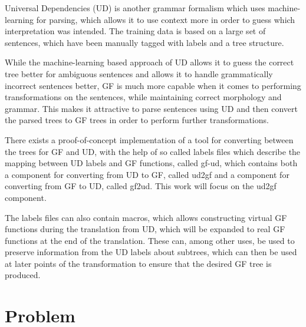\documentclass{article}
\begin{document}
Universal Dependencies\cite{mcdonald-al-2013} (UD) is another grammar formalism which uses machine-learning for parsing, which allows it to use context more in order to guess which interpretation was intended. The training data is based on a large set of sentences, which have been manually tagged with labels and a tree structure.

While the machine-learning based approach of UD allows it to guess the correct tree better for ambiguous sentences and allows it to handle grammatically incorrect sentences better, GF is much more capable when
it comes to performing transformations on the sentences, while maintaining correct morphology and grammar. This makes it attractive to parse sentences
using UD and then convert the parsed trees to GF trees in order to perform further transformations.

There exists a proof-of-concept implementation of a tool for converting between the trees for GF and UD, 
with the help of so called labels files which describe the mapping between UD labels and GF functions,
called gf-ud, which contains both a component for converting from UD to GF, called ud2gf\cite{kolachina-ranta-2017}
and a component for converting from GF to UD, called gf2ud\cite{kolachina-ranta-2016}. This work will focus on the ud2gf component.

The labels files can also contain macros, which allows constructing virtual GF functions during the translation from UD, which will be expanded to real GF functions at the end of the translation. 
These can, among other uses, be used to preserve information from the UD labels about subtrees, which can then be used at later points of the transformation to ensure that the desired GF tree is produced.






\section{Problem} 
\end{document}
